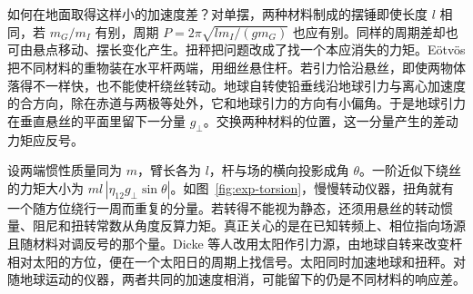 如何在地面取得这样小的加速度差？对单摆，两种材料制成的摆锤即使长度 $l$ 相同，若 $m_G/m_I$ 有别，周期 $P=2\pi\sqrt{lm_I/(gm_G)}$ 也应有别。同样的周期差却也可由悬点移动、摆长变化产生。扭秤把问题改成了找一个本应消失的力矩。Eötvös 把不同材料的重物装在水平杆两端，用细丝悬住杆。若引力恰沿悬丝，即使两物体落得不一样快，也不能使杆绕丝转动。地球自转使铅垂线沿地球引力与离心加速度的合方向，除在赤道与两极等处外，它和地球引力的方向有小偏角。于是地球引力在垂直悬丝的平面里留下一分量 $g_\perp$。交换两种材料的位置，这一分量产生的差动力矩应反号。

设两端惯性质量同为 $m$，臂长各为 $l$，杆与场的横向投影成角 $\theta$。一阶近似下绕丝的力矩大小为 $ml\,|\eta_{12}g_\perp\sin\theta|$。如图~\ref{fig:exp-torsion}，慢慢转动仪器，扭角就有一个随方位绕行一周而重复的分量。若转得不能视为静态，还须用悬丝的转动惯量、阻尼和扭转常数从角度反算力矩。真正关心的是在已知转频上、相位指向场源且随材料对调反号的那个量。Dicke 等人改用太阳作引力源，由地球自转来改变杆相对太阳的方位，便在一个太阳日的周期上找信号。太阳同时加速地球和扭秤。对随地球运动的仪器，两者共同的加速度相消，可能留下的仍是不同材料的响应差。

